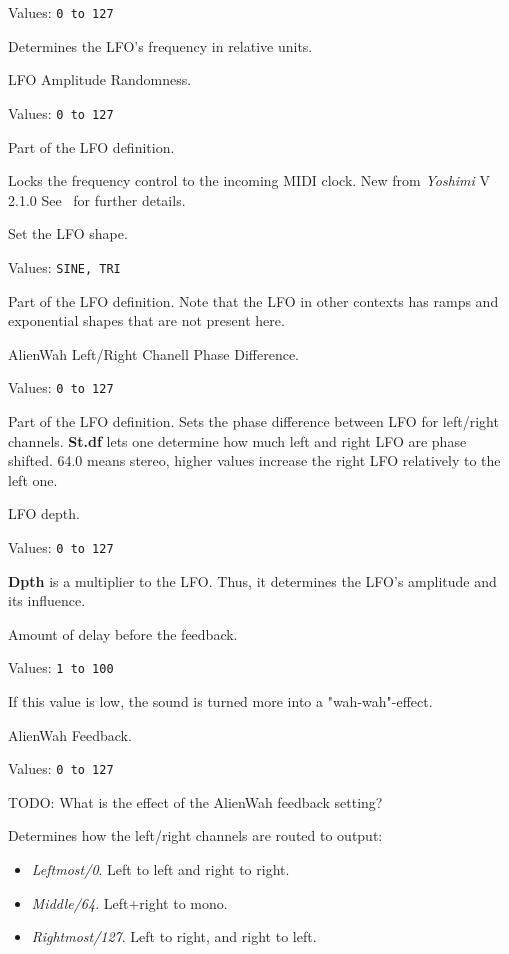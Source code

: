    Values: \texttt{0 to 127}

   Determines the LFO’s frequency in relative units.

   LFO Amplitude Randomness.

   Values: \texttt{0 to 127}

   Part of the LFO definition.

   Locks the frequency control to the incoming MIDI clock. New from
   \textsl{Yoshimi} V 2.1.0 See
   \ for further details.

   Set the LFO shape.

   Values: \texttt{SINE, TRI}

   Part of the LFO definition.
   Note that the LFO in other contexts has ramps and exponential shapes that
   are not present here.

   AlienWah Left/Right Chanell Phase Difference.

   Values: \texttt{0 to 127}

   Part of the LFO definition.
   Sets the phase difference between LFO for left/right channels.
   \textbf{St.df} lets one determine how much left and right LFO are phase
   shifted.  64.0 means stereo, higher values increase the right LFO
   relatively to the left one.

   LFO depth.

   Values: \texttt{0 to 127}

   \textbf{Dpth} is a multiplier to the LFO. Thus, it determines
   the LFO's amplitude and its influence.

   Amount of delay before the feedback.

   Values: \texttt{1 to 100}

   If this value is low, the sound is turned more into a "wah-wah"-effect.

   AlienWah Feedback.

   Values: \texttt{0 to 127}

   TODO: What is the effect of the AlienWah feedback setting?

   Determines how the left/right channels are routed to output:

   \begin{itemize}
      \item \textsl{Leftmost/0}. Left to left and right to right.
      \item \textsl{Middle/64}. Left+right to mono.
      \item \textsl{Rightmost/127}. Left to right, and right to left.
   \end{itemize}

